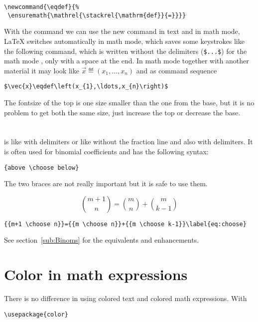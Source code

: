 \begin{table}[htb]
\begin{lstlisting}
\newcommand{\eqdef}{%
 \ensuremath{\mathrel{\stackrel{\mathrm{def}}{=}}}}
\end{lstlisting}
%
With the  command we can use the new  command in text
and in math mode, \LaTeX{} switches automatically in math mode, which
saves some keystrokes like the following command, which is written
without the delimiters (\texttt{\$...\$}) for the math mode \eqdef ,
only  with a space at the end. In math mode
together with another material it may look like 
$\vec{x}\eqdef\left(x_{1},\ldots,x_{n}\right)$ and as command sequence

\begin{lstlisting}
$\vec{x}\eqdef\left(x_{1},\ldots,x_{n}\right)$
\end{lstlisting}

The fontsize of the top is one size smaller than the one from the
base, but it is no problem to get both the same size, just increase the
top or decrease the base.

\section{}

 is like 
with delimiters or like 
without the fraction line and also with delimiters. It is often used
for binomial coefficients and has the following syntax:

\begin{lstlisting}
{above \choose below}
\end{lstlisting}
The two braces are not really important but it is safe to use them.

\begin{equation}
{{m+1 \choose n}}={{m \choose n}}+{{m \choose k-1}}\label{eq:choose}
\end{equation}

\begin{lstlisting}
{{m+1 \choose n}}={{m \choose n}}+{{m \choose k-1}}\label{eq:choose}
\end{lstlisting}


See section~\vref{sub:Binoms} for the \AmSmath equivalents and enhancements.

\section{Color in math expressions}\label{sec:color}
There is no difference in using colored text and colored math expressions. With
\begin{verbatim}
\usepackage{color}
\end{verbatim}


\end{table}

